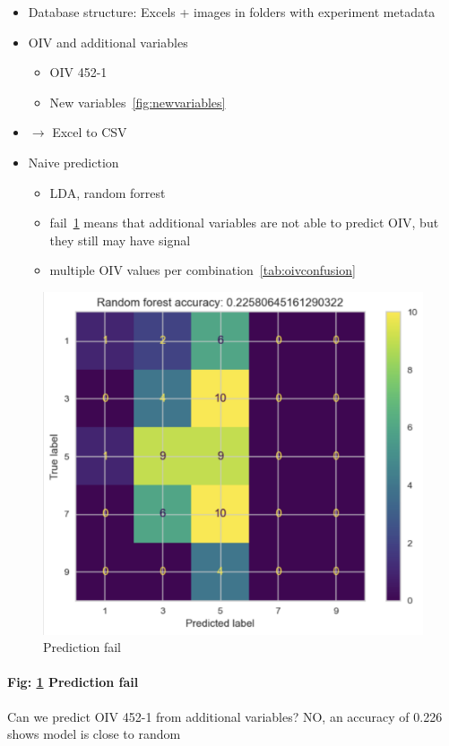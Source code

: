 \documentclass[english]{article}
\begin{document}
\begin{itemize}
	\item Database structure: Excels + images in folders with experiment metadata
	\item OIV and additional variables
	      \begin{itemize}
		      \item OIV 452-1
		      \item New variables~\ref{fig:newvariables}
	      \end{itemize}
	\item $\rightarrow$ Excel to CSV
	\item Naive prediction
	      \begin{itemize}
		      \item LDA, random forrest
		      \item fail~\ref{fig:predictionfail} means that additional variables are not able to predict OIV, but they still may have signal
		      \item multiple OIV values per combination~\ref{tab:oivconfusion}
	      \end{itemize}
\end{itemize}

\begin{figure}[H]
	\begin{center}
		\includegraphics[width=0.7\linewidth,trim={1mm 0 0 0},clip]{annotations_da_rfc_cm.png}
		\caption{Prediction fail}\label{fig:predictionfail}
	\end{center}
\end{figure}

\paragraph{Fig: \ref{fig:predictionfail} Prediction fail}
Can we predict OIV 452-1 from additional variables? NO, an accuracy of 0.226 shows model is close to random
\end{document}
